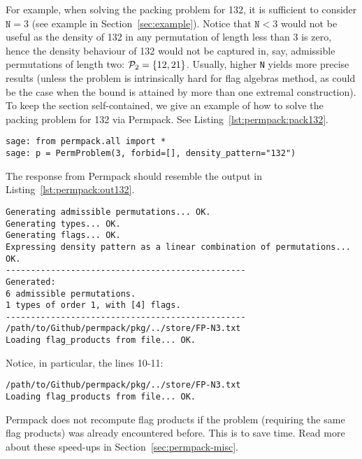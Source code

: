 \documentclass[12pt, a4paper, twoside]{report}
\begin{document}
For example, when solving the packing problem for 132, it is sufficient to consider $\texttt{N}=3$ (see example in Section~\ref{sec:example}). Notice that $\texttt{N}<3$ would not be useful as the density of 132 in any permutation of length less than 3 is zero, hence the density behaviour of 132 would not be captured in, say, admissible permutations of length two: $\P_2 = \{12,21\}$. Usually, higher \texttt{N} yields more precise results (unless the problem is intrinsically hard for flag algebras method, as could be the case when the bound is attained by more than one extremal construction). To keep the section self-contained, we give an example of how to solve the packing problem for 132 via Permpack. See Listing~\ref{lst:permpack:pack132}.

 {}
\begin{lstlisting}
sage: from permpack.all import *
sage: p = PermProblem(3, forbid=[], density_pattern="132")
\end{lstlisting}
The response from Permpack should resemble the output in Listing~\ref{lst:permpack:out132}.
\begin{lstlisting}
Generating admissible permutations... OK.
Generating types... OK.
Generating flags... OK.
Expressing density pattern as a linear combination of permutations... OK.
------------------------------------------------
Generated:
6 admissible permutations.
1 types of order 1, with [4] flags.
------------------------------------------------
/path/to/Github/permpack/pkg/../store/FP-N3.txt
Loading flag_products from file... OK.
\end{lstlisting}
Notice, in particular, the lines 10-11:
\begin{lstlisting}
/path/to/Github/permpack/pkg/../store/FP-N3.txt
Loading flag_products from file... OK.
\end{lstlisting}
Permpack does not recompute flag products if the problem (requiring the same flag products) was already encountered before. This is to save time. Read more about these speed-ups in Section~\ref{sec:permpack-misc}.
\end{document}
